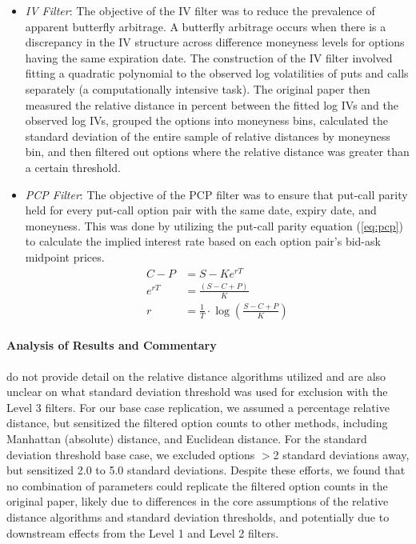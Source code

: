 \begin{itemize}
  \item \textit{IV Filter}: The objective of the IV filter was to reduce the prevalence of apparent butterfly arbitrage. A butterfly arbitrage occurs when there is a discrepancy in the IV structure across difference moneyness levels for options having the same expiration date. The construction of the IV filter involved fitting a quadratic polynomial to the observed log volatilities of puts and calls separately (a computationally intensive task). The original paper then measured the relative distance in percent between the fitted log IVs and the observed log IVs, grouped the options into moneyness bins, calculated the standard deviation of the entire sample of relative distances by moneyness bin, and then filtered out options where the relative distance was greater than a certain threshold.
  \item \textit{PCP Filter}: The objective of the PCP filter was to ensure that put-call parity held for every put-call option pair with the same date, expiry date, and moneyness. This was done by utilizing the put-call parity equation (\autoref{eq:pcp}) to calculate the implied interest rate based on each option pair's bid-ask midpoint prices.
\begin{align}
  \label{eq:pcp}
  C-P &= S-Ke^{rT} \\
  e^{rT} &= \frac{(S-C+P)}{K} \\
  r &= \frac{1}{T} \cdot \log\left(\frac{S-C+P}{K}\right)
\end{align}
\end{itemize}


\paragraph{Analysis of Results and Commentary}
\citet{constantinides2013} do not provide detail on the relative distance algorithms utilized and are also unclear on what standard deviation threshold was used for exclusion with the Level 3 filters. For our base case replication, we assumed a percentage relative distance, but sensitized the filtered option counts to other methods, including Manhattan (absolute) distance, and Euclidean distance. For the standard deviation threshold base case, we excluded options $>$2 standard deviations away, but sensitized 2.0 to 5.0 standard deviations. Despite these efforts, we found that no combination of parameters could replicate the filtered option counts in the original paper, likely due to differences in the core assumptions of the relative distance algorithms and standard deviation thresholds, and potentially due to downstream effects from the Level 1 and Level 2 filters. 


